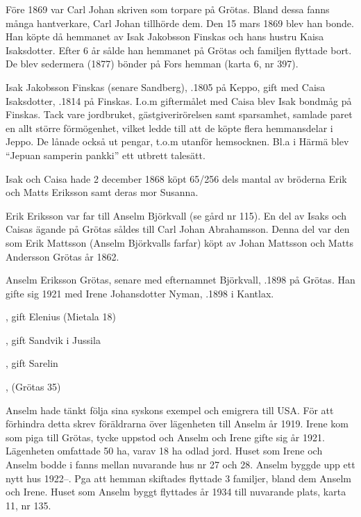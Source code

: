 Före 1869 var Carl Johan skriven som torpare på Grötas. Bland dessa fanns många hantverkare, Carl Johan tillhörde dem. Den 15 mars 1869 blev han bonde. Han köpte då hemmanet av Isak Jakobsson Finskas och hans hustru Kaisa Isaksdotter. Efter 6 år sålde han hemmanet på Grötas och familjen flyttade bort. De blev sedermera (1877) bönder på Fors hemman (karta 6, nr 397).


Isak Jakobsson Finskas (senare Sandberg), .1805 på Keppo, gift med Caisa Isaksdotter, .1814 på Finskas. I.o.m giftermålet med Caisa blev Isak bondmåg på Finskas. Tack vare jordbruket, gästgiverirörelsen samt sparsamhet, samlade paret en allt större förmögenhet, vilket ledde till att de köpte flera hemmansdelar i Jeppo. De lånade också ut pengar, t.o.m utanför hemsocknen. Bl.a i Härmä blev ``Jepuan samperin pankki'' ett utbrett talesätt.

Isak och Caisa hade 2 december 1868 köpt 65/256 dels mantal av bröderna Erik och Matts Eriksson samt deras mor Susanna.


Erik Eriksson var far till Anselm Björkvall (se gård nr 115). En del av Isaks och Caisas ägande på Grötas såldes till Carl Johan Abrahamsson. Denna del var den som Erik Mattsson (Anselm Björkvalls farfar) köpt av Johan Mattsson och Matts Andersson Grötas år 1862.





Anselm Eriksson Grötas, senare med efternamnet Björkvall, .1898 på Grötas. Han gifte sig 1921 med Irene Johansdotter Nyman, .1898 i Kantlax.
\begin{jhchildren}
  \item {}, gift Elenius (Mietala 18)
  \item {}, gift Sandvik i Jussila
  \item {}, gift Sarelin
  \item {}, (Grötas 35)
\end{jhchildren}

Anselm hade tänkt följa sina syskons exempel och emigrera till USA. För att förhindra detta skrev föräldrarna över lägenheten till Anselm år 1919. Irene kom som piga till Grötas, tycke uppstod och Anselm och Irene gifte sig år 1921. Lägenheten omfattade 50 ha, varav 18 ha odlad jord. Huset som Irene och Anselm bodde i fanns mellan nuvarande hus nr 27 och 28. Anselm byggde upp ett nytt hus 1922--. Pga att hemman skiftades flyttade 3 familjer, bland dem Anselm och Irene. Huset som Anselm byggt flyttades år 1934 till nuvarande plats, karta 11, nr 135.

